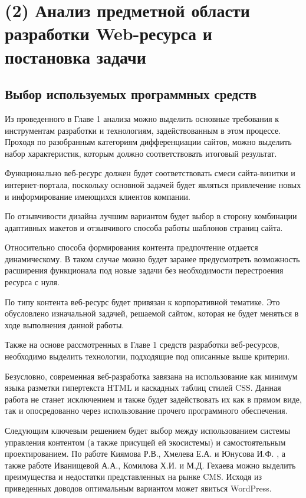 \section{(2) Анализ предметной области разработки Web-ресурса и постановка задачи}


\subsection{Выбор используемых программных средств}

Из проведенного в Главе 1 анализа можно выделить основные требования к инструментам разработки и технологиям, задействованным в этом процессе.
Проходя по разобранным категориям дифференциации сайтов, можно выделить набор характеристик, которым должно соответствовать итоговый результат.

Функционально веб-ресурс должен будет соответствовать смеси сайта-визитки и интернет-портала, поскольку основной задачей будет являться привлечение новых и информирование имеющихся клиентов компании.

По отзывчивости дизайна лучшим вариантом будет выбор в сторону комбинации адаптивных макетов и отзывчивого способа работы шаблонов страниц сайта.

Относительно способа формирования контента предпочтение отдается динамическому.
В таком случае можно будет заранее предусмотреть возможность расширения функционала под новые задачи без необходимости перестроения ресурса с нуля.

По типу контента веб-ресурс будет привязан к корпоративной тематике.
Это обусловлено изначальной задачей, решаемой сайтом, которая не будет меняться в ходе выполнения данной работы.

Также на основе рассмотренных в Главе 1 средств разработки веб-ресурсов, необходимо выделить технологии, подходящие под описанные выше критерии.

Безусловно, современная веб-разработка завязана на использование как минимум языка разметки гипертекста HTML и каскадных таблиц стилей CSS.
Данная работа не станет исключением и также будет задействовать их как в прямом виде, так и опосредованно через использование прочего программного обеспечения.

Следующим ключевым решением будет выбор между использованием системы управления контентом (а также присущей ей экосистемы) и самостоятельным проектированием.
По работе Киямова Р.В., Хмелева Е.А. и Юнусова И.Ф. \cite{kiyamov-cms}, а также работе Иванищевой А.А., Комилова Х.И. и М.Д. Гехаева \cite{ivanisheva-cms} можно выделить преимущества и недостатки представленных на рынке CMS.
Исходя из приведенных доводов оптимальным вариантом может явиться WordPress.

